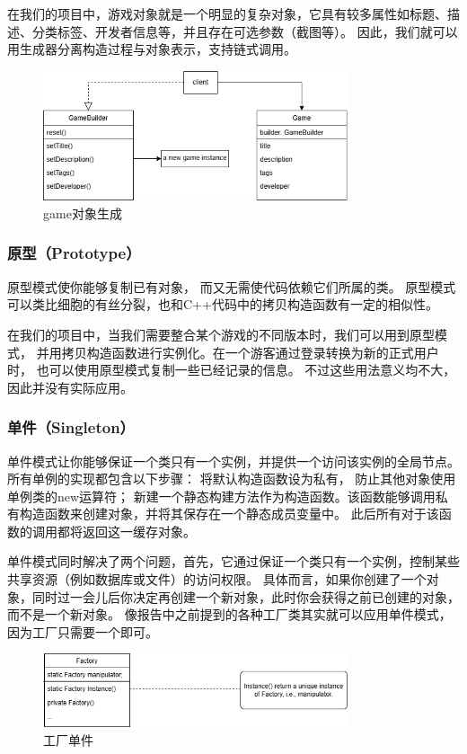 \documentclass[12pt]{ctexart} %
\begin{document}
在我们的项目中，游戏对象就是一个明显的复杂对象，它具有较多属性如标题、描述、分类标签、开发者信息等，并且存在可选参数（截图等）。
因此，我们就可以用生成器分离构造过程与对象表示，支持链式调用。
\begin{figure}[H]
  \centering
  \includegraphics[width=0.8\textwidth]{builder.png}
  \caption{game对象生成}
\end{figure}

\subsubsection{原型（Prototype）} 
原型模式使你能够复制已有对象， 而又无需使代码依赖它们所属的类。
原型模式可以类比细胞的有丝分裂，也和C++代码中的拷贝构造函数有一定的相似性。

在我们的项目中，当我们需要整合某个游戏的不同版本时，我们可以用到原型模式，
并用拷贝构造函数进行实例化。在一个游客通过登录转换为新的正式用户时，
也可以使用原型模式复制一些已经记录的信息。
不过这些用法意义均不大，因此并没有实际应用。

\subsubsection{单件（Singleton）} 
单件模式让你能够保证一个类只有一个实例，并提供一个访问该实例的全局节点。
所有单例的实现都包含以下步骤：
将默认构造函数设为私有， 防止其他对象使用单例类的new运算符；
新建一个静态构建方法作为构造函数。该函数能够调用私有构造函数来创建对象，并将其保存在一个静态成员变量中。
此后所有对于该函数的调用都将返回这一缓存对象。

单件模式同时解决了两个问题，首先，它通过保证一个类只有一个实例，控制某些共享资源（例如数据库或文件）的访问权限。
具体而言，如果你创建了一个对象，同时过一会儿后你决定再创建一个新对象，此时你会获得之前已创建的对象，而不是一个新对象。
像报告中之前提到的各种工厂类其实就可以应用单件模式，因为工厂只需要一个即可。
\begin{figure}[H]
  \centering
  \includegraphics[width=0.8\textwidth]{singleton_1.png}
  \caption{工厂单件}
\end{figure}
\end{document}
